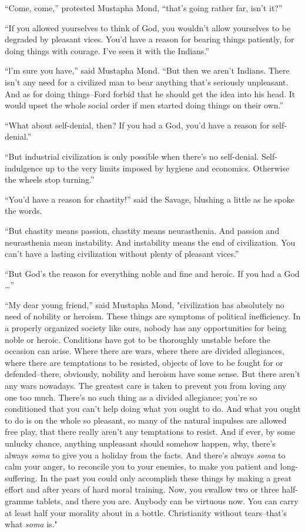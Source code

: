 \documentclass[12pt]{report}
\begin{document}
``Come, come,'' protested Mustapha Mond, ``that's going rather far,
isn't it?''

``If you allowed yourselves to think of God, you wouldn't allow
yourselves to be degraded by pleasant vices. You'd have a reason for
bearing things patiently, for doing things with courage. I've seen it
with the Indians.''

``l'm sure you have,'' said Mustapha Mond. ``But then we aren't Indians.
There isn't any need for a civilized man to bear anything that's
seriously unpleasant. And as for doing things--Ford forbid that he
should get the idea into his head. It would upset the whole social order
if men started doing things on their own.''

``What about self-denial, then? If you had a God, you'd have a reason
for self-denial.''

``But industrial civilization is only possible when there's no
self-denial. Self-indulgence up to the very limits imposed by hygiene
and economics. Otherwise the wheels stop turning.''

``You'd have a reason for chastity!'' said the Savage, blushing a little
as he spoke the words.

``But chastity means passion, chastity means neurasthenia. And passion
and neurasthenia mean instability. And instability means the end of
civilization. You can't have a lasting civilization without plenty of
pleasant vices.''

``But God's the reason for everything noble and fine and heroic. If you
had a God \ldots{}''

``My dear young friend,'' said Mustapha Mond, "civilization has
absolutely no need of nobility or heroism. These things are symptoms of
political inefficiency. In a properly organized society like ours,
nobody has any opportunities for being noble or heroic. Conditions have
got to be thoroughly unstable before the occasion can arise. Where there
are wars, where there are divided allegiances, where there are
temptations to be resisted, objects of love to be fought for or
defended--there, obviously, nobility and heroism have some sense. But
there aren't any wars nowadays. The greatest care is taken to prevent
you from loving any one too much. There's no such thing as a divided
allegiance; you're so conditioned that you can't help doing what you
ought to do. And what you ought to do is on the whole so pleasant, so
many of the natural impulses are allowed free play, that there really
aren't any temptations to resist. And if ever, by some unlucky chance,
anything unpleasant should somehow happen, why, there's always
\emph{soma} to give you a holiday from the facts. And there's always
\emph{soma} to calm your anger, to reconcile you to your enemies, to
make you patient and long-suffering. In the past you could only
accomplish these things by making a great effort and after years of hard
moral training. Now, you swallow two or three half-gramme tablets, and
there you are. Anybody can be virtuous now. You can carry at least half
your morality about in a bottle. Christianity without tears--that's what
\emph{soma} is."
\end{document}
